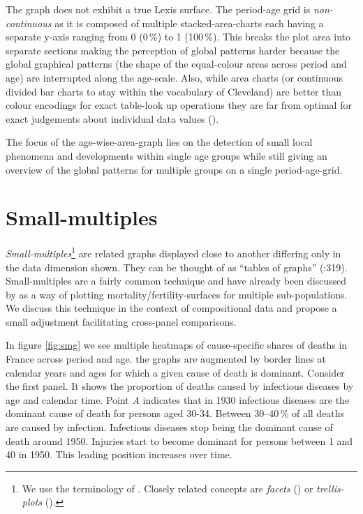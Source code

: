 \documentclass[a4paper]{scrartcl}
\begin{document}
The graph does not exhibit a true Lexis surface. The period-age grid is \emph{non-continuous} as it is composed of multiple stacked-area-charts each having a separate y-axis ranging from 0 (0\,\%) to 1 (100\,\%). This breaks the plot area into separate sections making the perception of global patterns harder because the global graphical patterns (the shape of the equal-colour areas across period and age) are interrupted along the age-scale. Also, while area charts (or continuous divided bar charts to stay within the vocabulary of Cleveland) are better than colour encodings for exact table-look up operations they are far from optimal for exact judgements about individual data values (\cite{Cleveland1994}).

The focus of the age-wise-area-graph lies on the detection of small local phenomena and developments within single age groups while still giving an overview of the global patterns for multiple groups on a single period-age-grid.

\section*{Small-multiples}

\emph{Small-multiples}\footnote{We use the terminology of \cite{Tufte1990}. Closely related concepts are \emph{facets} (\cite{Wilkinson2005}) or \emph{trellis-plots} (\cite{Becker1996}).} are related graphs displayed close to another differing only in the data dimension shown. They can be thought of as \enquote{tables of graphs} (\cite{Wilkinson2005}:319). Small-multiples are a fairly common technique and have already been discussed by \textcite{Vaupel1987} as a way of plotting mortality/fertility-surfaces for multiple sub-populations. We discuss this technique in the context of compositional data and propose a small adjustment facilitating cross-panel comparisons.

In figure \ref{fig:smg} we see multiple heatmaps of cause-specific shares of deaths in France across period and age. the graphs are augmented by border lines at calendar years and ages for which a given cause of death is dominant. Consider the first panel. It shows the proportion of deaths caused by infectious diseases by age and calendar time. Point \emph{A} indicates that in 1930 infectious diseases are the dominant cause of death for persons aged 30-34. Between 30--40\,\% of all deaths are caused by infection. Infectious diseases stop being the dominant cause of death around 1950. Injuries start to become dominant for persons between 1 and 40 in 1950. This leading position increases over time.
\end{document}
